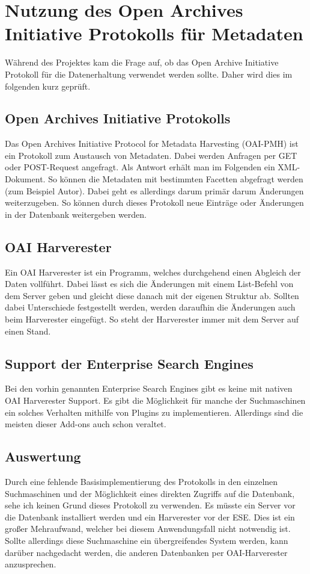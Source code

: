 \chapter{Nutzung des Open Archives Initiative Protokolls für Metadaten}

Während des Projektes kam die Frage auf, ob das Open Archive Initiative Protokoll für die Datenerhaltung verwendet werden sollte. Daher wird dies im folgenden kurz geprüft.


\section{Open Archives Initiative Protokolls}

Das Open Archives Initiative Protocol for Metadata Harvesting (OAI-PMH) ist ein Protokoll zum Austausch von Metadaten. Dabei werden Anfragen per GET oder POST-Request angefragt. Als Antwort erhält man im Folgenden ein XML-Dokument. So können die Metadaten mit bestimmten Facetten abgefragt werden (zum Beispiel Autor). Dabei geht es allerdings darum primär darum Änderungen weiterzugeben. So können durch dieses Protokoll neue Einträge oder Änderungen in der Datenbank weitergeben werden.
\cite{DeutscheNationalBibliothek.2019}

\section{OAI Harverester}

Ein OAI Harverester ist ein Programm, welches durchgehend einen Abgleich der Daten vollführt. Dabei lässt es sich die Änderungen mit einem List-Befehl von dem Server geben und gleicht diese danach mit der eigenen Struktur ab. Sollten dabei Unterschiede festgestellt werden, werden daraufhin die Änderungen auch beim Harverester eingefügt. So steht der Harverester immer mit dem Server auf einen Stand.
\cite{DeutscheNationalBibliothek.2019}

\section{Support der Enterprise Search Engines}

Bei den vorhin genannten Enterprise Search Engines gibt es keine mit nativen OAI Harverester Support. Es gibt die Möglichkeit für manche der Suchmaschinen ein solches Verhalten mithilfe von Plugins zu implementieren. Allerdings sind die meisten dieser Add-ons auch schon veraltet.

\section{Auswertung}

Durch eine fehlende Basisimplementierung des Protokolls in den einzelnen Suchmaschinen und der Möglichkeit eines direkten Zugriffs auf die Datenbank, sehe ich keinen Grund dieses Protokoll zu verwenden. Es müsste ein Server vor die Datenbank installiert werden und ein Harverester vor der ESE. Dies ist ein großer Mehraufwand, welcher bei diesem Anwendungsfall nicht notwendig ist. Sollte allerdings diese Suchmaschine ein übergreifendes System werden, kann darüber nachgedacht werden, die anderen Datenbanken per OAI-Harverester anzusprechen.